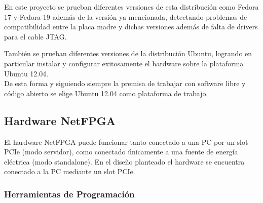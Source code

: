 En este proyecto se prueban diferentes versiones de esta distribución como Fedora 17 y Fedora 19 adem\'as de la versi\'on ya mencionada, detectando problemas de compatibilidad entre la placa madre y dichas versiones adem\'as de falta de drivers para el cable JTAG.


Tambi\'en se prueban diferentes versiones de la distribuci\'on Ubuntu, logrando en particular instalar y configurar exitosamente el hardware sobre la plataforma Ubuntu 12.04. \\

De esta forma y siguiendo siempre la premisa de trabajar con software libre y c\'odigo abierto se elige Ubuntu 12.04 como plataforma de trabajo.

\subsection{Hardware NetFPGA}

El hardware NetFPGA puede funcionar tanto conectado a una PC por un slot PCIe (modo servidor), como conectado \'unicamente a una fuente de energ\'ia el\'ectrica (modo standalone). En el dise\~no planteado el hardware se encuentra conectado a la PC mediante un slot PCIe.


\subsubsection{Herramientas de Programaci\'on}


